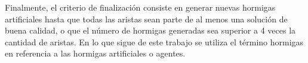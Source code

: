
Finalmente, el criterio de finalizaci\'on consiste en generar nuevas hormigas artificiales hasta que todas las aristas sean parte de al menos una soluci\'on de buena calidad, o que el n\'umero de hormigas generadas sea superior a 4 veces la cantidad de aristas. En lo que sigue de este trabajo se utiliza el t\'ermino hormigas en referencia a las hormigas artificiales o agentes.


